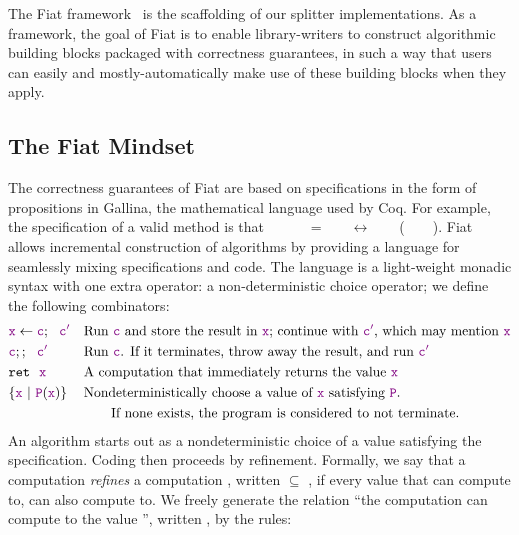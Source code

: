   The Fiat framework~\cite{fiat} is the scaffolding of our splitter implementations.  As a framework, the goal of Fiat is to enable library-writers to construct algorithmic building blocks packaged with correctness guarantees, in such a way that users can easily and mostly-automatically make use of these building blocks when they apply. 
  
  \subsection{The Fiat Mindset}
    The correctness guarantees of Fiat are based on specifications in the form of propositions in Gallina, the mathematical language used by Coq.  For example, the specification of a valid  method is that ~~~~~~=~~\true~~\allowbreak$\longleftrightarrow$\allowbreak~~~~(~~~~).  Fiat allows incremental construction of algorithms by providing a language for seamlessly mixing specifications and code.  The language is a light-weight monadic syntax with one extra operator: a non-deterministic choice operator; we define the following combinators:
    \begin{align*}
      &\textcolor{violet}{\texttt{x}} \leftarrow \textcolor{violet}{\texttt{c}};~~\textcolor{violet}{\texttt{c$'$}} && \text{Run \textcolor{violet}{\texttt{c}} and store the result in \textcolor{violet}{\texttt{x}}; continue with \textcolor{violet}{\texttt{c$'$}}, which may mention \textcolor{violet}{\texttt{x}}} \\
      &\textcolor{violet}{\texttt{c}};;~~\textcolor{violet}{\texttt{c$'$}}&&\text{Run \textcolor{violet}{\texttt{c}}.  If it terminates, throw away the result, and run \textcolor{violet}{\texttt{c$'$}}} \\
      &\texttt{ret}~~\textcolor{violet}{\texttt{x}} && \text{A computation that immediately returns the value \textcolor{violet}{\texttt{x}}} \\
      &\{ \textcolor{violet}{\texttt{x}}~|~\textcolor{violet}{\texttt{P}}(\textcolor{violet}{\texttt{x}}) \}&&\text{Nondeterministically choose a value of \textcolor{violet}{\texttt{x}} satisfying \textcolor{violet}{\texttt{P}}.} \\
      &&&\qquad\text{If none exists, the program is considered to not terminate.}
    \end{align*}
    An algorithm starts out as a nondeterministic choice of a value satisfying the specification.  Coding then proceeds by refinement.  Formally, we say that a computation  \emph{refines} a computation , written  $\subseteq$ , if every value that  can compute to,  can also compute to.  We freely generate the relation ``the computation  can compute to the value '', written , by the rules:

